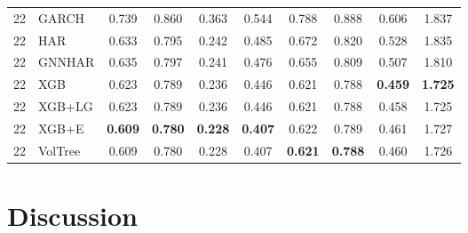 \documentclass[runningheads]{llncs}
\begin{document}
\begin{table}[t]
\begin{tabular}{ll cccc cccc}
\midrule
22 & GARCH    & 0.739 & 0.860 & 0.363 & 0.544 & 0.788 & 0.888 & 0.606 & 1.837 \\ %
22 & HAR      & 0.633 & 0.795 & 0.242 & 0.485 & 0.672 & 0.820 & 0.528 & 1.835 \\ %
22 & GNNHAR   & 0.635 & 0.797 & 0.241 & 0.476 & 0.655 & 0.809 & 0.507 & 1.810 \\ %
22 & XGB      & 0.623 & 0.789 & 0.236 & 0.446 & 0.621 & 0.788 & \textbf{0.459} & \textbf{1.725} \\ %
22 & XGB+LG   & 0.623 & 0.789 & 0.236 & 0.446 & 0.621 & 0.788 & 0.458 & 1.725 \\ %
22 & XGB+E    & \textbf{0.609} & \textbf{0.780} & \textbf{0.228} & \textbf{0.407} & 0.622 & 0.789 & 0.461 & 1.727 \\ %
22 & VolTree & 0.609 & 0.780 & 0.228 & 0.407 & \textbf{0.621} & \textbf{0.788} & 0.460 & 1.726 \\ %
\bottomrule
\end{tabular}
\end{table}

\FloatBarrier
\section{Discussion}
\end{document}
